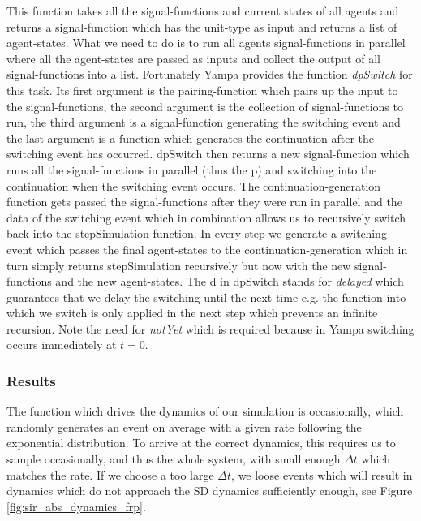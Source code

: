This function takes all the signal-functions and current states of all agents and returns a signal-function which has the unit-type as input and returns a list of agent-states. What we need to do is to run all agents signal-functions in parallel where all the agent-states are passed as inputs and collect the output of all signal-functions into a list. Fortunately Yampa provides the function \textit{dpSwitch} for this task. Its first argument is the pairing-function which pairs up the input to the signal-functions, the second argument is the collection of signal-functions to run, the third argument is a signal-function generating the switching event and the last argument is a function which generates the continuation after the switching event has occurred.
dpSwitch then returns a new signal-function which runs all the signal-functions in parallel (thus the p) and switching into the continuation when the switching event occurs. The continuation-generation function gets passed the signal-functions after they were run in parallel and the data of the switching event which in combination allows us to recursively switch back into the stepSimulation function. In every step we generate a switching event which passes the final agent-states to the continuation-generation which in turn simply returns stepSimulation recursively but now with the new signal-functions and the new agent-states. 
The d in dpSwitch stands for \textit{delayed} which guarantees that we delay the switching until the next time e.g. the function into which we switch is only applied in the next step which prevents an infinite recursion. Note the need for \textit{notYet} which is required because in Yampa switching occurs immediately at $t = 0$.

\subsubsection{Results}
The function which drives the dynamics of our simulation is occasionally, which randomly generates an event on average with a given rate following the exponential distribution. To arrive at the correct dynamics, this requires us to sample occasionally, and thus the whole system, with small enough $\Delta t$ which matches the rate. If we choose a too large $\Delta t$, we loose events which will result in dynamics which do not approach the SD dynamics sufficiently enough, see Figure \ref{fig:sir_abs_dynamics_frp}.

